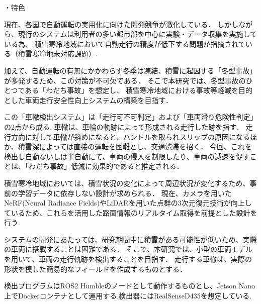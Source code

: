 \documentclass[a4paper]{jarticle}
\begin{document}

%
%
%
%
・特色{
  現在、各国で自動運転の実用化に向けた開発競争が激化している．
	しかしながら、現行のシステムは利用者の多い都市部を中心に実験・データ収集を実施している為、
	積雪寒冷地域において自動走行の精度が低下する問題が指摘されている（積雪寒冷地未対応課題）\cite{tesla}\cite{jigyo}.

	加えて、自動運転の有無にかかわらず冬季は凍結、積雪に起因する「冬型事故」が多発する\cite{hokkaido}ため、この対策が不可欠である．
	そこで本研究では、冬型事故のひとつである「わだち事故」を想定し、
	積雪寒冷地域における事故等軽減を目的とした車両走行安全性向上システムの構築を目指す．
	
	この「車轍検出システム」は「走行可不可判定」および「車両滑り危険性判定」の2点から成る.
	車轍は、車輪の軌跡によって形成される走行した跡を指す．
	走行方向に対して車轍が斜めになると、ハンドルを取られスリップの原因になるほか、積雪深によっては直接の運転を困難とし、交通渋滞を招く．
	今回、これを検出し自動ないしは半自動にて、車両の侵入を制限したり、車両の減速を促すことは、「わだち事故」低減に効果的であると推定される．

	積雪寒冷地域においては、積雪状況の変化によって周辺状況が変化するため、事前の学習データに依存しない設計が求められる．
	現在、カメラを用いたNeRF(Neural Radiance Fields)やLiDARを用いた点群の3次元復元技術が向上しているため、これらを活用した路面情報のリアルタイム取得を前提とした設計を行う.

	システムの開発にあたっては、研究期間中に積雪がある可能性が低いため、実際の車両に搭載することは困難である．
	そこで、本研究では、小型の車両モデルを用いて、車両の走行軌跡を検出することを目指す．
	走行する車轍は、実際の形状を模した簡易的なフィールドを作成するものとする．

	検出プログラムはROS2 Humbleのノードとして動作するものとし、Jetson Nano上でDockerコンテナとして運用する.検出器にはRealSenseD435を想定している.
}
%
%
%
%
\end{document}
